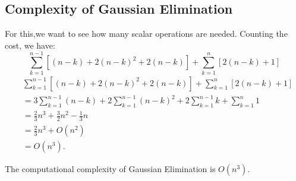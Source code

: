 \documentclass[../main/main.tex]{subfiles}
\begin{document}
\subsection{Complexity of Gaussian Elimination}
For this,we want to see how many scalar operations are needed. Counting the cost, we have: \[
  \sum_{k=1}^{n-1} \left[(n-k)+2(n-k)^2+2(n-k)\right] + \sum_{k=1}^n \left[2(n-k)+1\right]
\]
\begin{align*}
  &\sum_{k=1}^{n-1} \left[(n-k)+2(n-k)^2+2(n-k)\right] + \sum_{k=1}^n \left[2(n-k)+1\right] \\
  &= 3 \sum_{k=1}^{n-1} (n-k) + 2 \sum_{k=1}^{n-1} (n-k)^2 + 2 \sum_{k=1}^{n-1} k + \sum_{k=1}^n 1\\
  &= \frac{2}{3}n^{3} + \frac{3}{2}n^2 - \frac{1}{3}n \\
  &= \frac{2}{3}n^{3} + O(n^2)\\
  &= O(n^{3})
  .\end{align*}
\begin{theorem}
The computational complexity of Gaussian Elimination is $O(n^{3})$.
\end{theorem}
\end{document}
